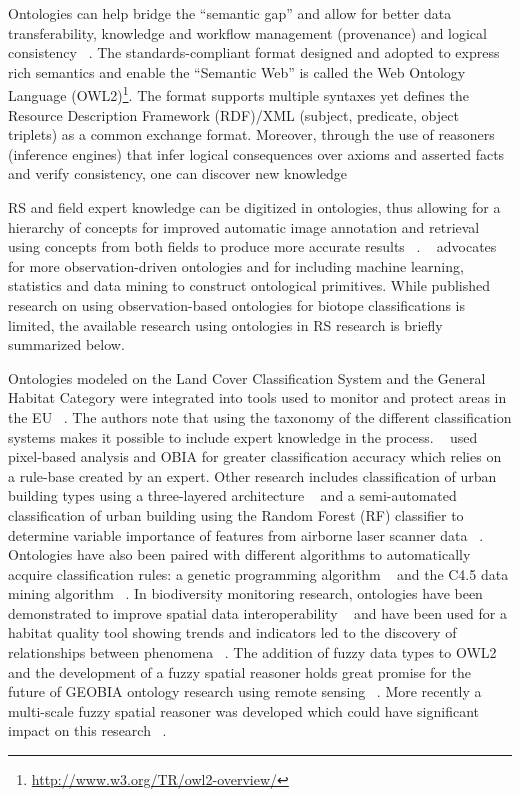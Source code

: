 \documentclass[authoryear,preprint,12pt,number]{elsarticle}
\begin{document}
Ontologies can help bridge the ``semantic gap'' and allow for better data
transferability, knowledge and workflow
management (provenance) and logical consistency ~\citep{Janowicz2012}.  The
standards-compliant format designed and adopted to express rich semantics and
enable the ``Semantic Web'' is called the Web Ontology Language
(OWL2)\footnote{\url{http://www.w3.org/TR/owl2-overview/}}. The format supports
multiple syntaxes yet defines the Resource Description Framework (RDF)/XML
(subject, predicate, object triplets) as a common exchange format.  Moreover,
through the use of reasoners (inference engines) that infer logical consequences
over axioms and asserted facts and verify consistency, one can discover new
knowledge ~\citep{Arvor2013, Andres2013a}

RS and field expert knowledge can be digitized in ontologies, thus allowing for
a hierarchy of concepts for improved automatic image annotation and retrieval
using concepts from both fields to produce more accurate results
~\citep{Srikanth2005}. ~\cite{Janowicz2012} advocates for more
observation-driven ontologies and for including machine learning, statistics and
data mining to construct ontological primitives. While published research on
using observation-based ontologies for biotope classifications is limited, the
available research using ontologies in RS research is briefly summarized below.

Ontologies modeled on the Land Cover Classification System and the General
Habitat Category were integrated into tools used to monitor and protect areas in
the EU ~\citep{Arvor2013}. The authors note that using the taxonomy of the
different classification systems makes it possible to include expert knowledge
in the process. ~\cite{Lucas2015} used pixel-based analysis and OBIA for greater
classification accuracy which relies on a rule-base created by an expert. Other
research includes classification of urban building types using a three-layered
architecture ~\citep{diSciascio2013} and a semi-automated classification of 
urban
building using the Random Forest (RF) classifier to determine variable
importance of features from airborne laser scanner data ~\citep{Belgiu2014}.
Ontologies have also been paired with different algorithms to automatically
acquire classification rules: a genetic programming algorithm
~\citep{Forestier2012470} and the C4.5 data mining algorithm
~\citep{Sheeren2006ML}. In biodiversity monitoring research, ontologies have 
been
demonstrated to improve spatial data interoperability ~\citep{Nieland2015a,
Nieland2015b} and have been used for a habitat quality tool showing trends and
indicators led to the discovery of relationships between phenomena
~\citep{Perez-Luque2015}.
The addition of fuzzy data types to OWL2 and the development of a fuzzy spatial
reasoner holds great promise for the future of GEOBIA ontology research using
remote sensing ~\citep{Belgiu2013, Bobillo2015}. More recently a 
multi-scale
fuzzy spatial reasoner was developed which could have significant impact on this
research ~\citep{Argyridis2015}.
\end{document}
